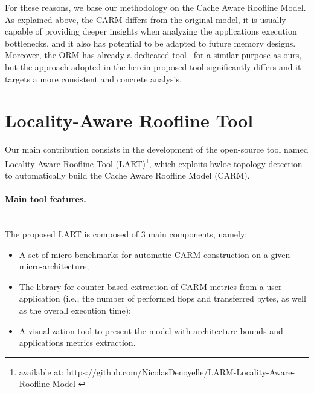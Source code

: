 \documentclass[twoside,twocolumn,8pt]{extarticle}
\begin{document}
For these reasons, we base our methodology on the Cache Aware Roofline Model. 
As explained above, the CARM differs from the original model, it is usually capable of providing deeper insights when analyzing the
applications execution bottlenecks, and it also has potential to be adapted to future memory designs. Moreover, the ORM has already
a dedicated tool~\cite{Lo2015} for a similar purpose as ours, but the approach adopted in the herein proposed tool significantly
differs and it targets a more consistent and concrete analysis.

\section{Locality-Aware Roofline Tool}\label{sec:contrib}

Our main contribution consists in the development of the open-source tool named Locality Aware Roofline Tool (LART)\footnote{available at: https://github.com/NicolasDenoyelle/LARM-Locality-Aware-Roofline-Model-}, which
exploits hwloc topology detection to automatically build the Cache Aware Roofline Model (CARM).

\paragraph*{Main tool features.}\mbox{}\\

The proposed LART is composed of 3 main components, namely:
\begin{itemize}
\item A set of micro-benchmarks for automatic CARM construction on a given micro-architecture;
\item The library for counter-based extraction  of CARM metrics from a user application (i.e., the number of performed flops and
  transferred bytes, as well as the overall execution time);
\item A visualization tool to present the model with architecture bounds and applications metrics extraction.
\end{itemize}
\end{document}
